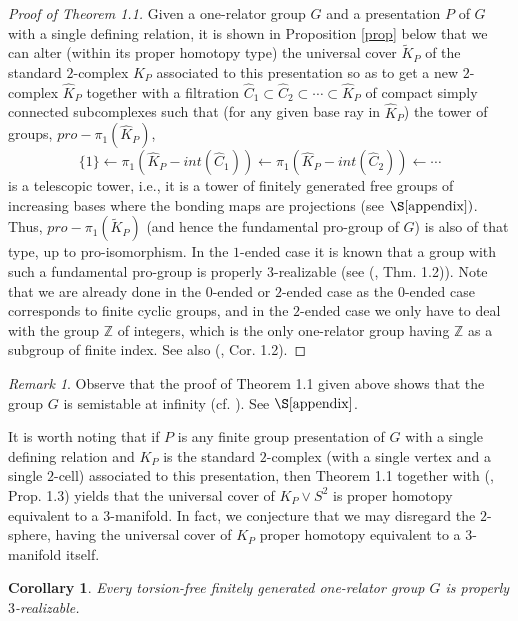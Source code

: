 \documentclass{amsart}[12pt]
\newtheorem{corollary}[theorem]{Corollary}
\theoremstyle{definition}
\theoremstyle{remark}
\newtheorem{remark}[theorem]{Remark}
\numberwithin{equation}{section}
\begin{document}
\begin{proof}[Proof of Theorem 1.1] Given a one-relator group $G$ and a
presentation $P$ of $G$ with a single defining relation, it is
shown in Proposition \ref{prop} below that we can alter (within
its proper homotopy type) the universal cover $\tilde{K}_P$ of the
standard $2$-complex $K_P$ associated to this presentation so as
to get a new $2$-complex $\widehat{K}_P$ together with a
filtration $\widehat{C}_1 {\subset} \widehat{C}_2 {\subset} \cdots {\subset}
\widehat{K}_P$ of compact simply connected subcomplexes such that
(for any given base ray in $\widehat{K}_P$) the tower of groups,
$pro-\pi_1(\widehat{K}_P)$,
\[
\{1\} \leftarrow \pi_1(\widehat{K}_P - int(\widehat{C}_1))
\leftarrow \pi_1(\widehat{K}_P - int(\widehat{C}_2)) \leftarrow
\cdots
\]
is a telescopic tower, i.e., it is a tower of finitely generated
free groups of increasing bases where the bonding maps are
projections (see $\S \ref{appendix})$. Thus,
$pro-\pi_1(\tilde{K}_P)$ (and hence the fundamental pro-group of
$G$) is also of that type, up to pro-isomorphism. In the $1$-ended
case it is known that a group with such a fundamental pro-group is
properly $3$-realizable (see (\cite{L4}, Thm. 1.2)). Note that we
are already done in the $0$-ended or $2$-ended case as the
$0$-ended case corresponds to finite cyclic groups, and in the
$2$-ended case we only have to deal with the group ${\mathbb Z}$ of
integers, which is the only one-relator group having ${\mathbb Z}$ as a
subgroup of finite index. See also (\cite{ACLQ}, Cor. 1.2).
\end{proof}
\begin{remark} Observe that the proof of Theorem 1.1 given above shows
that the group $G$ is semistable at infinity (cf. \cite{MT}). See
$\S \ref{appendix}$.
\end{remark}
\indent It is worth noting that if $P$ is any finite group
presentation of $G$ with a single defining relation and $K_P$ is
the standard $2$-complex (with a single vertex and a single
$2$-cell) associated to this presentation, then Theo\-rem 1.1
together with (\cite{ACLQ}, Prop. 1.3) yields that the universal
cover of $K_P \vee S^2$ is proper homotopy equivalent to a
$3$-manifold. In fact, we conjecture that we may disregard the
$2$-sphere, having the universal cover of $K_P$ proper homotopy
equivalent to a $3$-manifold itself.
\begin{corollary} Every torsion-free finitely generated one-relator group $G$ is properly $3$-realizable.
\end{corollary}
\end{document}
